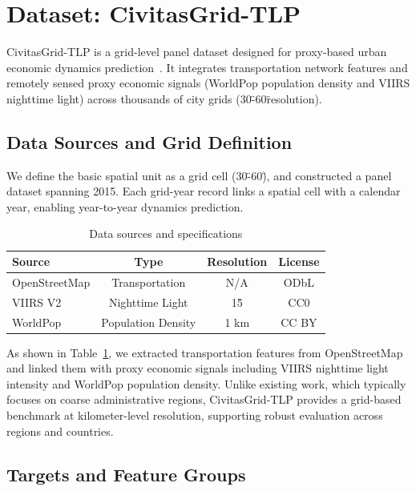 \documentclass[11pt,conference,onecolumn]{IEEEtran}
\begin{document}
\section{Dataset: CivitasGrid-TLP}

CivitasGrid-TLP is a grid-level panel dataset designed for proxy-based urban economic dynamics prediction~\cite{huang_2026_18144416}. It integrates transportation network features and remotely sensed proxy economic signals (WorldPop population density and VIIRS nighttime light) across thousands of city grids (30\" -60\" resolution).

\subsection{Data Sources and Grid Definition}

We define the basic spatial unit as a grid cell (30\"-60\"), and constructed a panel dataset spanning 2015. Each grid-year record links a spatial cell with a calendar year, enabling year-to-year dynamics prediction.


\begin{table}[H]
    \centering
    \begin{tabular}{lccc}
        \toprule
        \textbf{Source} & \textbf{Type} & \textbf{Resolution} & \textbf{License}\\
        \midrule
         OpenStreetMap & Transportation & N/A & ODbL \\
         VIIRS V2 & Nighttime Light & 15\" & CC0 \\
         WorldPop & Population Density & 1 km & CC BY \\
        \bottomrule
    \end{tabular}
    \caption{Data sources and specifications}
    \label{tab:datasources}
\end{table}


As shown in Table~\ref{tab:datasources}, we extracted transportation features from OpenStreetMap and linked them with proxy economic signals including VIIRS nighttime light intensity and WorldPop population density. Unlike existing work, which typically focuses on coarse administrative regions, CivitasGrid-TLP provides a grid-based benchmark at kilometer-level resolution, supporting robust evaluation across regions and countries.


\subsection{Targets and Feature Groups}
\end{document}

